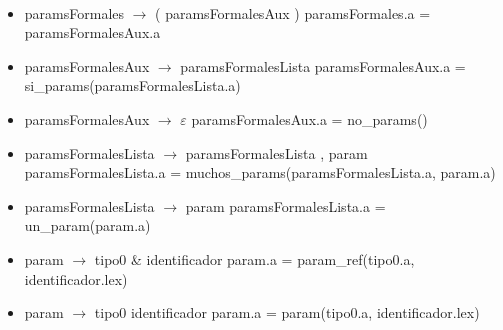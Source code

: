 \documentclass[11pt]{article}
\begin{document}
        \ 
        \begin{itemize}
            \item paramsFormales $\rightarrow$ ( paramsFormalesAux )
                \subitem paramsFormales.a = paramsFormalesAux.a
            \item paramsFormalesAux $\rightarrow$ paramsFormalesLista
                \subitem paramsFormalesAux.a = si\_params(paramsFormalesLista.a)
            \item paramsFormalesAux $\rightarrow$ $\varepsilon$
                \subitem paramsFormalesAux.a = no\_params()
            \item paramsFormalesLista $\rightarrow$ paramsFormalesLista , param
                \subitem paramsFormalesLista.a = muchos\_params(paramsFormalesLista.a, param.a)
            \item paramsFormalesLista $\rightarrow$ param
                \subitem paramsFormalesLista.a = un\_param(param.a)
            \item param $\rightarrow$ tipo0 \& identificador
                \subitem param.a = param\_ref(tipo0.a, identificador.lex)
            \item param $\rightarrow$ tipo0 identificador
                \subitem param.a = param(tipo0.a, identificador.lex)
        \end{itemize}
        \ 
\end{document}
